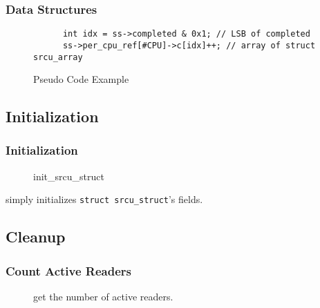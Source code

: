 \documentclass{beamer}
\begin{document}

\begin{frame}[t, fragile]
  \frametitle{Data Structures}

  \begin{figure}
    \begin{lstlisting}
      int idx = ss->completed & 0x1; // LSB of completed
      ss->per_cpu_ref[#CPU]->c[idx]++; // array of struct srcu_array
    \end{lstlisting}
    \caption{Pseudo Code Example}
  \end{figure}
  
\end{frame}


\subsection{Initialization}


\begin{frame}[t]
  \frametitle{Initialization}

  \begin{figure}
    
    \caption{init\_srcu\_struct}
  \end{figure}

  simply initializes \texttt{struct srcu\_struct}'s fields.
  
\end{frame}


\subsection{Cleanup}


\begin{frame}[t]
  \frametitle{Count Active Readers}

  \begin{figure}
      
    \caption{get the number of active readers.}
  \end{figure}
  
\end{frame}
\end{document}
